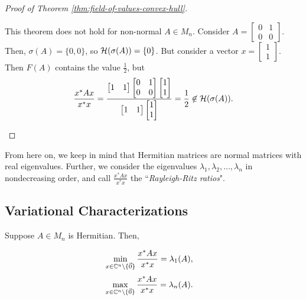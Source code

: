 \begin{proof}[Proof of Theorem \ref{thm:field-of-values-convex-hull}]
\begin{example}
This theorem does not hold for non-normal $A \in M_n$. Consider $A = \begin{bmatrix}0 & 1 \\ 0 & 0\end{bmatrix}$. Then, $\sigma(A) = \{0, 0\}$, so $\mathcal{H}(\sigma(A)) = \{0\}$. But consider a vector $x = \begin{bmatrix}1 \\ 1 \end{bmatrix}$. Then $F(A)$ contains the value $\frac{1}{2}$, but
$$
\frac{x^* A x}{x^*x} 
    = \frac{
            \begin{bmatrix}1 & 1\end{bmatrix} 
            \begin{bmatrix}0 & 1 \\ 0 & 0\end{bmatrix}
            \begin{bmatrix}1 \\ 1\end{bmatrix}
        }
        {
            \begin{bmatrix}1 & 1\end{bmatrix}
            \begin{bmatrix}1 \\ 1\end{bmatrix}
        }
    = \frac12 \not \in \mathcal{H}(\sigma(A)).
$$
\end{example}
\end{proof}

\noindent From here on, we keep in mind that Hermitian matrices are normal matrices with real eigenvalues. Further, we consider the eigenvalues $\lambda_1, \lambda_2, \dots, \lambda_n$ in nondecreasing order, and call $\frac{x^*Ax}{x^*x}$ the ``\textit{Rayleigh-Ritz ratios}".

\clearpage 

\subsection{Variational Characterizations}

\begin{theorem}
\label{thm:Rayleigh-Ritz}
Suppose $A \in M_n$ is Hermitian. Then,
\begin{multicols}{2}
\noindent \begin{align*}
    \min_{x \in \mathbb C^n \setminus \{\Vec{0}\}} \frac{x^*Ax}{x^*x} &= \lambda_1(A),
\end{align*}
\begin{align*}
    \max_{x \in \mathbb C^n \setminus \{\Vec{0}\}} \frac{x^*Ax}{x^*x} &= \lambda_n(A).
\end{align*}
\end{multicols}
\end{theorem}

